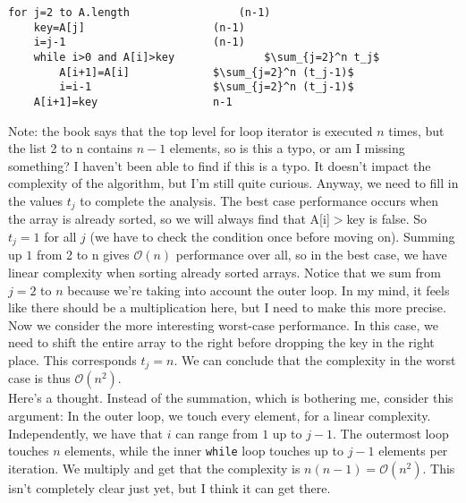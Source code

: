 \documentclass[12pt,english]{article}
\begin{document}
\begin{lstlisting}[mathescape=true]
for j=2 to A.length					(n-1)
	key=A[j]					(n-1)
	i=j-1						(n-1)
	while i>0 and A[i]>key				$\sum_{j=2}^n t_j$ 	
		A[i+1]=A[i]				$\sum_{j=2}^n (t_j-1)$ 
		i=i-1					$\sum_{j=2}^n (t_j-1)$ 
	A[i+1]=key					n-1
\end{lstlisting}


Note: the book says that the top level for loop iterator is executed $n$ times, but the list 2 to n contains $n-1$ elements, so is this a typo, or am I missing something?  I haven't been able to find if this is a typo.  It doesn't impact the complexity of the algorithm, but I'm still quite curious.  Anyway, we need to fill in the values $t_j$ to complete the analysis.  The best case performance occurs when the array is already sorted, so we will always find that A[i]$>$key is false.  So $t_j = 1$ for all $j$ (we have to check the condition once before moving on).  Summing up $1$ from 2 to n gives $\mathcal{O}(n)$ performance over all, so in the best case, we have linear complexity when sorting already sorted arrays.  Notice that we sum from $j=2$ to $n$ because we're taking into account the outer loop.  In my mind, it feels like there should be a multiplication here, but I need to make this more precise. \\

Now we consider the more interesting worst-case performance.  In this case, we need to shift the entire array to the right before dropping the key in the right place.  This corresponds $t_j = n$.  We can conclude that the complexity in the worst case is thus $\mathcal{O}(n^2)$.   \\

Here's a thought.  Instead of the summation, which is bothering me, consider this argument:  In the outer loop, we touch every element, for a linear complexity.  Independently, we have that $i$ can range from $1$ up to $j-1$.   The outermost loop touches $n$ elements, while the inner \texttt{while} loop touches up to $j-1$ elements per iteration.  We multiply and get that the complexity is $n(n-1) = \mathcal{O}(n^2)$.  This isn't completely clear just yet, but I think it can get there.



{}

\end{document}
